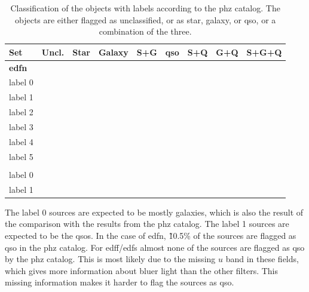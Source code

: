 \begin{table}[H]
\centering
\begin{tabular}{lcccccccc}
\toprule
Set & Uncl. & Star & Galaxy & S+G & \gls{qso} & S+Q & G+Q & S+G+Q \\
\midrule
\multicolumn{9}{l}{\textbf{\gls{edfn}}} \\
label 0 &  \\
label 1 &  \\
label 2 &  \\
label 3 &  \\
label 4 &  \\
label 5 &  \\
\addlinespace
\midrule
\multicolumn{9}{l}{\textbf{\gls{edff}/\gls{edfs}}} \\
label 0 &  \\
label 1 &  \\
\bottomrule
\end{tabular}
\caption{Classification of the objects with labels according to the \gls{phz} catalog. The objects are either flagged as unclassified, or as star, galaxy, or \gls{qso}, or a combination of the three.}
\label{tab: galaxy}
\end{table}
The label 0 sources are expected to be mostly galaxies, which is also the result of the comparison with the results from the \gls{phz} catalog. The label 1 sources are expected to be the \glspl{qso}. In the case of \gls{edfn}, \~10.5\% of the sources are flagged as \gls{qso} in the \gls{phz} catalog. For \gls{edff}/\gls{edfs} almost none of the sources are flagged as \gls{qso} by the \gls{phz} catalog. This is most likely due to the missing $u$ band in these fields, which gives more information about bluer light than the other filters. This missing information makes it harder to flag the sources as \gls{qso}.  



